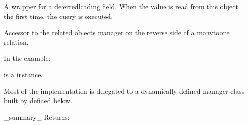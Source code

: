 \documentclass[letterpaper,10pt,french]{sphinxmanual}
\begin{document}
\begin{fulllineitems}
\begin{fulllineitems}
\end{fulllineitems}


\begin{fulllineitems}
\label{\detokenize{main/model:main.models.Etudiant.nom}}
\pysigstartsignatures
{}
\pysigstopsignatures
\sphinxAtStartPar
A wrapper for a deferred\sphinxhyphen{}loading field. When the value is read from this
object the first time, the query is executed.

\end{fulllineitems}


\begin{fulllineitems}
\label{\detokenize{main/model:main.models.Etudiant.note_set}}
\pysigstartsignatures
{}
\pysigstopsignatures
\sphinxAtStartPar
Accessor to the related objects manager on the reverse side of a
many\sphinxhyphen{}to\sphinxhyphen{}one relation.

\sphinxAtStartPar
In the example:

\begin{sphinxVerbatim}[commandchars=\\\{\}]
 
       
\end{sphinxVerbatim}

\sphinxAtStartPar
{} is a  instance.

\sphinxAtStartPar
Most of the implementation is delegated to a dynamically defined manager
class built by  defined below.

\end{fulllineitems}


\begin{fulllineitems}
\label{\detokenize{main/model:main.models.Etudiant.notes_etudiant_matiere}}
\pysigstartsignatures
{}
\pysigstopsignatures
\sphinxAtStartPar
\_summary\_
Returns:
\begin{quote}


\end{quote}
\end{fulllineitems}
\end{fulllineitems}
\end{document}
